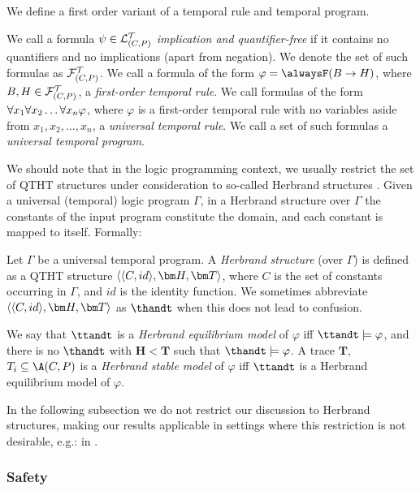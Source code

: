 We define a first order variant of a temporal rule and temporal program.

\begin{definition}
  We call a formula $\psi \in \mathcal{L}_{(C,P)}^\mathcal{T}$ \emph{implication and
    quantifier-free} if it contains no quantifiers and no implications
  (apart from negation). We denote the set of such formulas as
  $\mathcal{F}_{(C,P)}^\mathcal{T}$. We call a formula of the form $\varphi=\tempruleshort$,
  where $B, H \in \mathcal{F}_{(C,P)}^\mathcal{T}$, a \emph{first-order temporal rule}. We
  call formulas of the form $\forall x_1 \forall x_2 \dots \forall x_n \varphi$, where $\varphi$ is a
  first-order temporal rule with no variables aside from
  $x_1, x_2, \dots, x_n$, a \emph{universal temporal rule}. We call a
  set of such formulas a \emph{universal temporal program}.
\end{definition}

We should note that in the logic programming context, we usually
restrict the set of QTHT structures under consideration to so-called
Herbrand structures \cite{peaval06a}. Given a universal (temporal)
logic program $\Gamma$, in a Herbrand structure over $\Gamma$ the
constants of the input program constitute the domain, and each
constant is mapped to itself. Formally:

\begin{definition}
  Let $\Gamma$ be a universal temporal program. A \emph{Herbrand
    structure} (over $\Gamma$) is defined as a QTHT structure
  $\herbrandhandt$, where $C$ is the set of constants occurring in
  $\Gamma$, and $id$ is the identity function. We sometimes abbreviate
  $\herbrandhandt$ as $\thandt$ when this does not lead to confusion.

  We say that $\ttandt$ is a \emph{Herbrand equilibrium model} of
  $\varphi$ iff $\ttandt \models \varphi$, and there is no $\thandt$
  with $\bm{H} < \bm{T}$ such that $\thandt \models \varphi$. A trace
  $\bm{T}$, $T_i \subseteq \A(C,P)$ is a \emph{Herbrand stable model}
  of $\varphi$ iff $\ttandt$ is a Herbrand equilibrium model of
  $\varphi$.

\end{definition}

In the following subsection we do not restrict our discussion to
Herbrand structures, making our results applicable in settings where
this restriction is not desirable, e.g.: in \cite{henive08a}.

\subsubsection{Safety}

